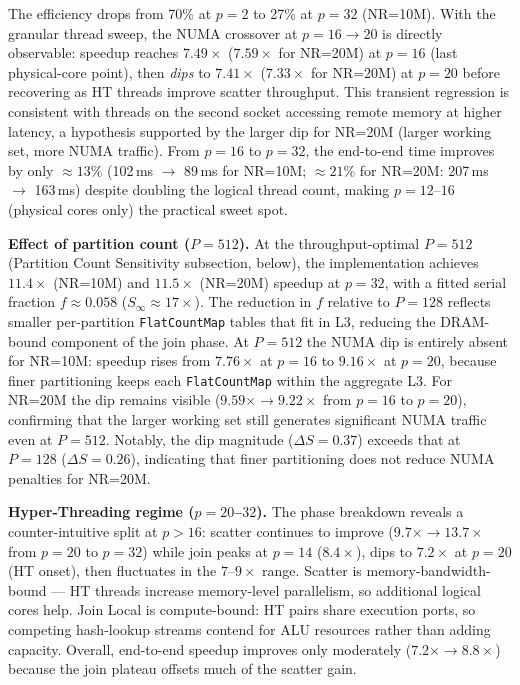 \documentclass[10pt,a4paper,twocolumn]{article}
\begin{document}
The efficiency drops from 70\% at $p=2$ to 27\% at $p=32$ (NR=10M). With the granular thread sweep, the NUMA crossover at $p=16\to20$ is directly observable: speedup reaches $7.49\times$ ($7.59\times$ for NR=20M) at $p=16$ (last physical-core point), then \emph{dips} to $7.41\times$ ($7.33\times$ for NR=20M) at $p=20$ before recovering as HT threads improve scatter throughput. This transient regression is consistent with threads on the second socket accessing remote memory at higher latency, a hypothesis supported by the larger dip for NR=20M (larger working set, more NUMA traffic). From $p=16$ to $p=32$, the end-to-end time improves by only $\approx 13\%$ (102\,ms $\to$ 89\,ms for NR=10M; $\approx 21\%$ for NR=20M: 207\,ms $\to$ 163\,ms) despite doubling the logical thread count, making $p=12$--$16$ (physical cores only) the practical sweet spot.

\textbf{Effect of partition count ($P=512$).} At the throughput-optimal $P=512$ (Partition Count Sensitivity subsection, below), the implementation achieves $11.4\times$ (NR=10M) and $11.5\times$ (NR=20M) speedup at $p=32$, with a fitted serial fraction $f\approx0.058$ ($S_\infty\approx17\times$). The reduction in $f$ relative to $P=128$ reflects smaller per-partition \texttt{FlatCountMap} tables that fit in L3, reducing the DRAM-bound component of the join phase. At $P=512$ the NUMA dip is entirely absent for NR=10M: speedup rises from $7.76\times$ at $p=16$ to $9.16\times$ at $p=20$, because finer partitioning keeps each \texttt{FlatCountMap} within the aggregate L3. For NR=20M the dip remains visible ($9.59\times \to 9.22\times$ from $p=16$ to $p=20$), confirming that the larger working set still generates significant NUMA traffic even at $P=512$. Notably, the dip magnitude ($\Delta S=0.37$) exceeds that at $P=128$ ($\Delta S=0.26$), indicating that finer partitioning does not reduce NUMA penalties for NR=20M.

\textbf{Hyper-Threading regime ($p = 20$--$32$).}
The phase breakdown reveals a counter-intuitive split at $p > 16$: scatter continues to improve ($9.7\times \to 13.7\times$ from $p=20$ to $p=32$) while join peaks at $p=14$ ($8.4\times$), dips to $7.2\times$ at $p=20$ (HT onset), then fluctuates in the $7$--$9\times$ range. Scatter is memory-bandwidth-bound --- HT threads increase memory-level parallelism, so additional logical cores help. Join Local is compute-bound: HT pairs share execution ports, so competing hash-lookup streams contend for ALU resources rather than adding capacity. Overall, end-to-end speedup improves only moderately ($7.2\times \to 8.8\times$) because the join plateau offsets much of the scatter gain.
\end{document}
